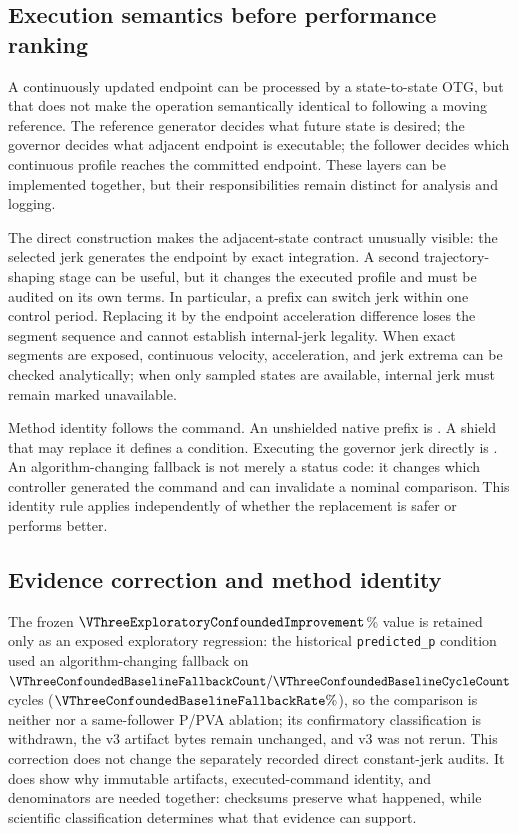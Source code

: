 \subsection{Execution semantics before performance ranking}

A continuously updated endpoint can be processed by a state-to-state OTG, but
that does not make the operation semantically identical to following a moving
reference.  The reference generator decides what future state is desired; the
governor decides what adjacent endpoint is executable; the follower decides
which continuous profile reaches the committed endpoint.  These layers can be
implemented together, but their responsibilities remain distinct for analysis
and logging.

The direct construction makes the adjacent-state contract unusually visible:
the selected jerk generates the endpoint by exact integration.  A second
trajectory-shaping stage can be useful, but it changes the executed profile
and must be audited on its own terms.  In particular, a \Ruckig{} prefix can
switch jerk within one control period.  Replacing it by the endpoint
acceleration difference loses the segment sequence and cannot establish
internal-jerk legality.  When exact segments are exposed, continuous velocity,
acceleration, and jerk extrema can be checked analytically; when only sampled
states are available, internal jerk must remain marked unavailable.

Method identity follows the command.  An unshielded native prefix is
\OrdinaryRuckig{}.  A shield that may replace it defines a
\ViabilityShieldedRuckig{} condition.  Executing the governor jerk directly is
\DirectConstantJerkExecution{}.  An algorithm-changing fallback is not merely
a status code: it changes which controller generated the command and can
invalidate a nominal comparison.  This identity rule applies independently of
whether the replacement is safer or performs better.

\subsection{Evidence correction and method identity}
\label{sec:evidence-correction}

The frozen \(\VThreeExploratoryConfoundedImprovement\)\% value is retained only
as an exposed exploratory regression: the historical \texttt{predicted\_p}
condition used an algorithm-changing fallback on
\(\VThreeConfoundedBaselineFallbackCount/
\VThreeConfoundedBaselineCycleCount\) cycles
(\(\VThreeConfoundedBaselineFallbackRate\%\)), so the comparison is neither
\OrdinaryRuckig{} nor a
same-follower P/PVA ablation; its confirmatory classification is withdrawn,
the v3 artifact bytes remain unchanged, and v3 was not rerun.  This correction
does not change the separately recorded direct constant-jerk audits.  It does
show why immutable artifacts, executed-command identity, and denominators are
needed together: checksums preserve what happened, while scientific
classification determines what that evidence can support.

